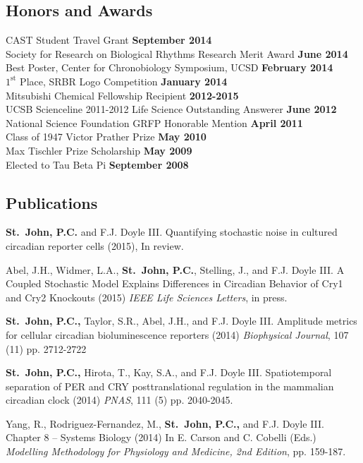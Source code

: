 {\subsection*{Honors and Awards} 
CAST Student Travel Grant \hfill {\bfseries September 2014}\\
Society for Research on Biological Rhythms Research Merit Award \hfill {\bf June 2014}\\
Best Poster, Center for Chronobiology Symposium, UCSD \hfill {\bf February 2014} \\
$1^\textrm{st}$ Place, SRBR Logo Competition \hfill {\bf January 2014} \\
Mitsubishi Chemical Fellowship Recipient \hfill {\bf 2012-2015} \\
UCSB Scienceline 2011-2012 Life Science Outstanding Answerer \hfill {\bf June 2012} \\
National Science Foundation GRFP Honorable Mention \hfill {\bf April 2011} \\
Class of 1947 Victor Prather Prize \hfill {\bf May 2010}\\
Max Tischler Prize Scholarship \hfill  {\bf May 2009}\\
Elected to Tau Beta Pi \hfill  {\bf September 2008}\\

\subsection*{Publications}
{\bfseries St.\ John, P.C.} and F.J. Doyle III. Quantifying stochastic noise in cultured circadian reporter cells (2015), In review.

Abel, J.H., Widmer, L.A., {\bfseries St.\ John, P.C.}, Stelling, J., and F.J. Doyle III. A Coupled Stochastic Model Explains Differences in Circadian Behavior of Cry1 and Cry2 Knockouts (2015) {\itshape IEEE Life Sciences Letters}, in press.

{\bfseries St.\ John, P.C.,} Taylor, S.R., Abel, J.H., and F.J. Doyle III. Amplitude metrics for cellular circadian bioluminescence reporters (2014) {\itshape Biophysical Journal}, 107 (11) pp. 2712-2722

{\bfseries St.\ John, P.C.,} Hirota, T., Kay, S.A., and F.J. Doyle III.
Spatiotemporal separation of PER and CRY posttranslational regulation in the
mammalian circadian clock (2014) {\itshape PNAS}, 111 (5) pp. 2040-2045.

Yang, R., Rodriguez-Fernandez, M., {\bfseries St.\ John, P.C.,} and F.J. Doyle III. Chapter 8 -- Systems Biology (2014) In E. Carson and C. Cobelli (Eds.)
{\itshape Modelling Methodology for Physiology and Medicine, 2nd Edition}, pp.
159-187.

}
